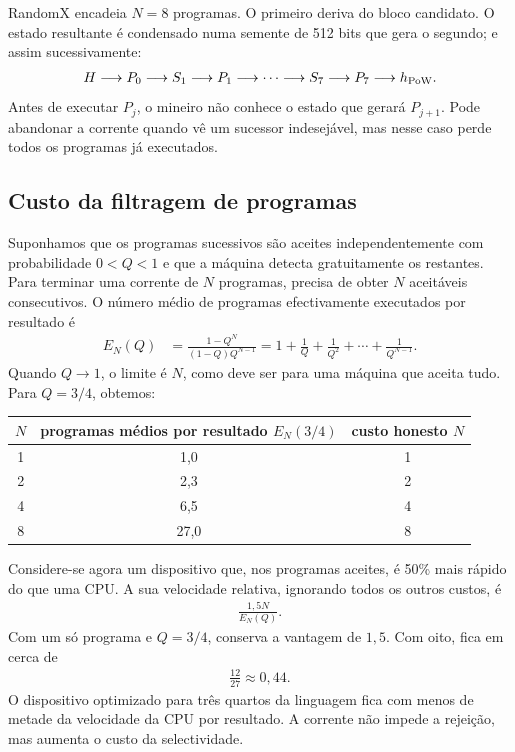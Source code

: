 RandomX encadeia \(N=8\) programas. O primeiro deriva do bloco candidato. O
estado resultante é condensado numa semente de 512 bits que gera o segundo; e
assim sucessivamente:
\begin{align}
 H\longrightarrow P_0\longrightarrow S_1\longrightarrow P_1
 \longrightarrow\cdots\longrightarrow S_7\longrightarrow P_7
 \longrightarrow h_{\rm PoW}.
 \label{eq:randomx-program-chain}
\end{align}
Antes de executar \(P_j\), o mineiro não conhece o estado que gerará
\(P_{j+1}\). Pode abandonar a corrente quando vê um sucessor indesejável, mas
nesse caso perde todos os programas já executados.

\subsection{Custo da filtragem de programas}

Suponhamos que os programas sucessivos são aceites independentemente com
probabilidade \(0<Q<1\) e que a máquina
detecta gratuitamente os restantes. Para terminar uma corrente de \(N\)
programas, precisa de obter \(N\) aceitáveis consecutivos. O número médio de
programas efectivamente executados por resultado é
\begin{align}
 E_N(Q)
 &=\frac{1-Q^N}{(1-Q)Q^{N-1}}
  =1+\frac1Q+\frac1{Q^2}+\cdots+\frac1{Q^{N-1}}.
 \label{eq:randomx-filter-cost}
\end{align}
Quando \(Q\to1\), o limite é \(N\), como deve ser para uma máquina que aceita
tudo. Para \(Q=3/4\), obtemos:

\begin{center}
\begin{tabular}{c|c|c}
\(N\)&programas médios por resultado \(E_N(3/4)\)&custo honesto \(N\)\\
\hline
1&1{,}0&1\\
2&2{,}3&2\\
4&6{,}5&4\\
8&27{,}0&8\\
\end{tabular}
\end{center}

Considere-se agora um dispositivo que, nos programas aceites, é 50\% mais rápido
do que uma CPU. A sua velocidade relativa, ignorando todos os outros custos,
é
\begin{align*}
 \frac{1{,}5N}{E_N(Q)}.
\end{align*}
Com um só programa e \(Q=3/4\), conserva a vantagem de \(1{,}5\). Com oito,
fica em cerca de
\begin{align*}
 \frac{12}{27}\approx0{,}44.
\end{align*}
O dispositivo optimizado para três quartos da linguagem fica com menos de
metade da velocidade da CPU por resultado. A corrente não impede a rejeição,
mas aumenta o custo da selectividade.

